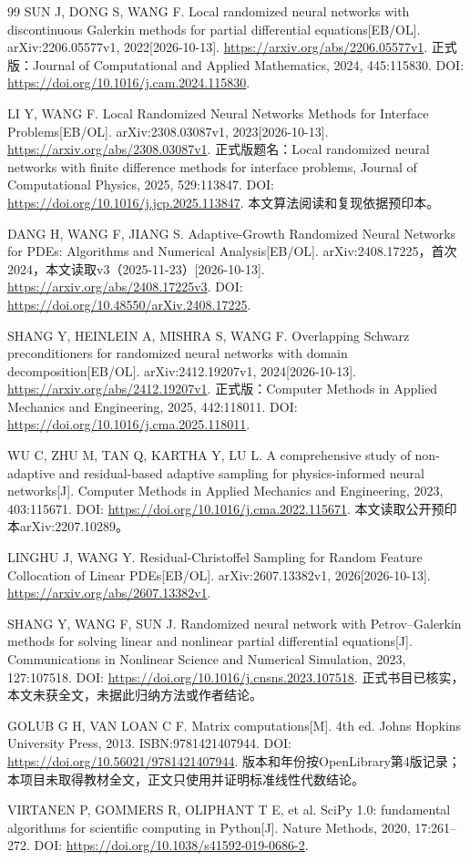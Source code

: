 \begin{thebibliography}{99}
 SUN J, DONG S, WANG F. Local randomized neural networks with discontinuous Galerkin methods for partial differential equations[EB/OL]. arXiv:2206.05577v1, 2022[2026-10-13]. \url{https://arxiv.org/abs/2206.05577v1}. 正式版：Journal of Computational and Applied Mathematics, 2024, 445:115830. DOI: \url{https://doi.org/10.1016/j.cam.2024.115830}.

 LI Y, WANG F. Local Randomized Neural Networks Methods for Interface Problems[EB/OL]. arXiv:2308.03087v1, 2023[2026-10-13]. \url{https://arxiv.org/abs/2308.03087v1}. 正式版题名：Local randomized neural networks with finite difference methods for interface problems, Journal of Computational Physics, 2025, 529:113847. DOI: \url{https://doi.org/10.1016/j.jcp.2025.113847}. 本文算法阅读和复现依据预印本。

 DANG H, WANG F, JIANG S. Adaptive-Growth Randomized Neural Networks for PDEs: Algorithms and Numerical Analysis[EB/OL]. arXiv:2408.17225，首次2024，本文读取v3（2025-11-23）[2026-10-13]. \url{https://arxiv.org/abs/2408.17225v3}. DOI: \url{https://doi.org/10.48550/arXiv.2408.17225}.

 SHANG Y, HEINLEIN A, MISHRA S, WANG F. Overlapping Schwarz preconditioners for randomized neural networks with domain decomposition[EB/OL]. arXiv:2412.19207v1, 2024[2026-10-13]. \url{https://arxiv.org/abs/2412.19207v1}. 正式版：Computer Methods in Applied Mechanics and Engineering, 2025, 442:118011. DOI: \url{https://doi.org/10.1016/j.cma.2025.118011}.

 WU C, ZHU M, TAN Q, KARTHA Y, LU L. A comprehensive study of non-adaptive and residual-based adaptive sampling for physics-informed neural networks[J]. Computer Methods in Applied Mechanics and Engineering, 2023, 403:115671. DOI: \url{https://doi.org/10.1016/j.cma.2022.115671}. 本文读取公开预印本arXiv:2207.10289。

 LINGHU J, WANG Y. Residual-Christoffel Sampling for Random Feature Collocation of Linear PDEs[EB/OL]. arXiv:2607.13382v1, 2026[2026-10-13]. \url{https://arxiv.org/abs/2607.13382v1}.

 SHANG Y, WANG F, SUN J. Randomized neural network with Petrov--Galerkin methods for solving linear and nonlinear partial differential equations[J]. Communications in Nonlinear Science and Numerical Simulation, 2023, 127:107518. DOI: \url{https://doi.org/10.1016/j.cnsns.2023.107518}. 正式书目已核实，本文未获全文，未据此归纳方法或作者结论。

 GOLUB G H, VAN LOAN C F. Matrix computations[M]. 4th ed. Johns Hopkins University Press, 2013. ISBN:9781421407944. DOI: \url{https://doi.org/10.56021/9781421407944}. 版本和年份按OpenLibrary第4版记录；本项目未取得教材全文，正文只使用并证明标准线性代数结论。

 VIRTANEN P, GOMMERS R, OLIPHANT T E, et al. SciPy 1.0: fundamental algorithms for scientific computing in Python[J]. Nature Methods, 2020, 17:261--272. DOI: \url{https://doi.org/10.1038/s41592-019-0686-2}.
\end{thebibliography}
